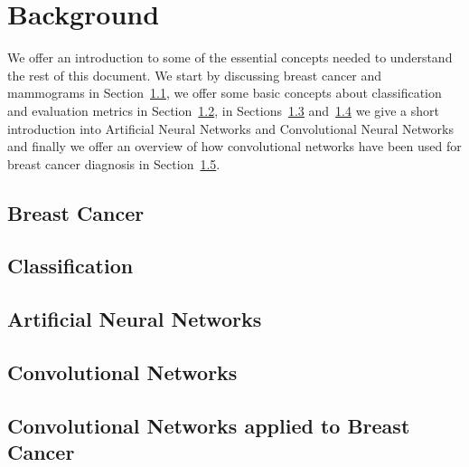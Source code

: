 \documentclass[11pt]{article}
\begin{document}
\section{Background}
\label{sec:Background}
We offer an introduction to some of the essential concepts needed to understand the rest of this document. We start by discussing breast cancer and mammograms in Section~\ref{subsec:BreastCancer}, 
we offer some basic concepts about classification and evaluation metrics in Section~\ref{subsec:Classification}, in Sections~\ref{subsec:ANNs} and~\ref{subsec:ConvNets} we give a short introduction into Artificial Neural Networks and Convolutional Neural Networks and finally we offer an overview of how convolutional networks have been used for breast cancer diagnosis in Section~\ref{subsec:BreastCancerConvNets}.

	\subsection{Breast Cancer}
	\label{subsec:BreastCancer}
	


	\subsection{Classification}
	\label{subsec:Classification}
	

	\subsection{Artificial Neural Networks}
	\label{subsec:ANNs}
	

	\subsection{Convolutional Networks}
	\label{subsec:ConvNets}
	

	\subsection{Convolutional Networks applied to Breast Cancer}
	\label{subsec:BreastCancerConvNets}	
\end{document}

